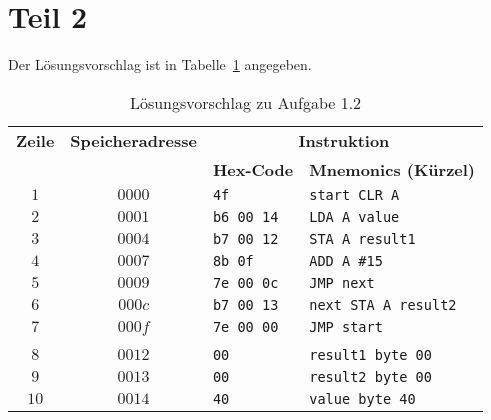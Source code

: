 \section{Teil 2}

Der Lösungsvorschlag ist in Tabelle~\ref{tab:speicherinstruktionen} angegeben.

\begin{table}[h!]
    \setlength{\tabcolsep}{0.5em}
    \def\arraystretch{1.5}
    \centering
    \begin{tabular}{|c|c|l|l|}
        \hline
        \textbf{Zeile} & \textbf{Speicheradresse} & \multicolumn{2}{c|}{\textbf{Instruktion}} \\
        \cline{3-4}
        &                          & \textbf{Hex-Code} & \textbf{Mnemonics (Kürzel)} \\
        \hline
        $1$ & $0000$ & \texttt{4f} & \texttt{start CLR A}  \\

        $2$ & $0001$ & \texttt{b6 00 14} & \qquad\quad\texttt{LDA A value}  \\

        $3$ & $0004$ & \texttt{b7 00 12} & \qquad\quad\texttt{STA A result1}  \\

        $4$ & $0007$ & \texttt{8b 0f} & \qquad\quad\texttt{ADD A \#15}  \\

        $5$ & $0009$ & \texttt{7e 00 0c} & \qquad\quad\texttt{JMP next}  \\

        $6$ & $000c$ & \texttt{b7 00 13} & \texttt{next STA A result2}  \\

        $7$ & $000f$ & \texttt{7e 00 00} & \qquad\quad\texttt{JMP start}\\
        &&&\\
        $8$ & $0012$ & \texttt{00} & \texttt{result1 byte 00}  \\
        $9$ & $0013$ & \texttt{00} & \texttt{result2 byte 00}  \\
        $10$ & $0014$ & \texttt{40} & \texttt{value byte 40}  \\

        \hline
    \end{tabular}
    \caption{Lösungsvorschlag zu Aufgabe 1.2}
    \label{tab:speicherinstruktionen}
\end{table}
